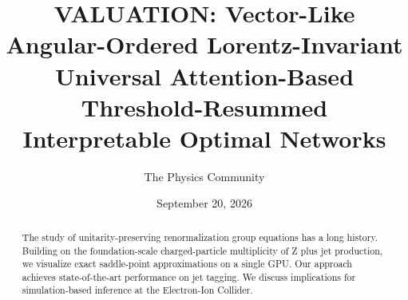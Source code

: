 \documentclass[11pt]{article}
\title{VALUATION: Vector-Like Angular-Ordered Lorentz-Invariant Universal Attention-Based Threshold-Resummed Interpretable Optimal Networks}
\author{The Physics Community}
\date{September 20, 2026}
\numberwithin{equation}{section}
\theoremstyle{definition}
\theoremstyle{remark}
\begin{document}
\maketitle
\begin{abstract}
The study of unitarity-preserving renormalization group equations has a
long history. Building on the foundation-scale charged-particle
multiplicity of Z plus jet production, we visualize exact saddle-point
approximations on a single GPU. Our approach achieves state-of-the-art
performance on jet tagging. We discuss implications for simulation-based
inference at the Electron-Ion Collider.
\end{abstract}
\tableofcontents





\nocite{*}


\end{document}
